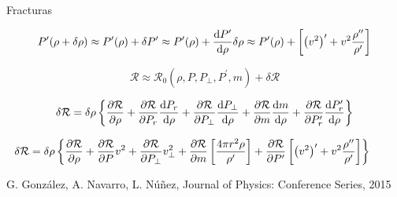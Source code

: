 \documentclass[handout,t]{beamer}
\begin{document}
\begin{frame}{Fracturas}

\vspace{-9mm}

\begin{equation}
\footnotesize
P^{\prime} (\rho + \delta \rho) \approx P^{\prime} (\rho) + \delta P^{\prime} \approx P^{\prime} (\rho) + \frac{\mathrm{d} P^{\prime}}{\mathrm{d} \rho} \delta \rho \approx P^{\prime} (\rho) + \left[ { \left( v^{2} \right) }^{\prime} + v^{2} \frac{\rho^{\prime \prime}}{\rho^{\prime}} \right]
\end{equation}

\begin{equation*}
\mathcal{R} \approx \mathcal{R}_{0} \left( \rho, P, P_{\perp}, P^{\prime}, m \right) + \delta \mathcal{R}
\end{equation*}

\begin{equation}
\label{EqHidPer}
\scriptsize
\delta \mathcal{R} = \delta \rho \left\lbrace \frac{\partial \mathcal{R}}{\partial \rho} + \frac{\partial \mathcal{R}}{\partial P_{r}} \frac{\mathrm{d} P_{r}}{\mathrm{d} \rho} + \frac{\partial \mathcal{R}}{\partial P_{\perp}} \frac{\mathrm{d} P_{\perp}}{\mathrm{d} \rho} + \frac{\partial \mathcal{R}}{\partial m} \frac{\mathrm{d} m}{\mathrm{d} \rho} + \frac{\partial \mathcal{R}}{\partial P_{r}^{\prime}} \frac{\mathrm{d} P_{r}^{\prime}}{\mathrm{d} \rho} \right\rbrace  
\end{equation}

\begin{equation}
\hspace{-8mm}
\scriptsize
\label{EqHidPer}
\delta \mathcal{R} = \delta \rho \left\lbrace \frac{\partial \mathcal{R}}{\partial \rho} + \frac{\partial \mathcal{R}}{\partial P} v^{2} + \frac{\partial \mathcal{R}}{\partial P_{\perp}} v^{2}_{\perp} + \frac{\partial \mathcal{R}}{\partial m} \left[ \frac{4 \pi r^{2} \rho}{\rho^{\prime}} \right] + \frac{\partial \mathcal{R}}{\partial P^{\prime}} \left[ { \left( v^{2} \right) }^{\prime} + v^{2} \frac{\rho^{\prime \prime}}{\rho^{\prime}} \right] \right\rbrace
\end{equation}

\vspace{10mm}

\tiny \centering G. González, A. Navarro, L. Núñez, Journal of Physics: Conference Series, 2015

\end{frame}
\end{document}
